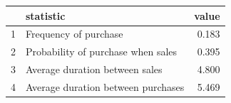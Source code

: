 \begin{tabular}{rlr}
  \hline
 & statistic & value \\ 
  \hline
1 & Frequency of purchase & 0.183 \\ 
  2 & Probability of purchase when sales & 0.395 \\ 
  3 & Average duration between sales & 4.800 \\ 
  4 & Average duration between purchases & 5.469 \\ 
   \hline
\end{tabular}

